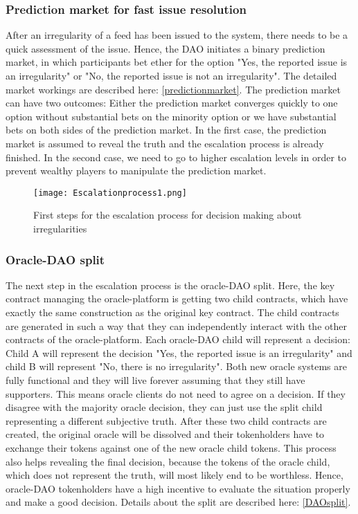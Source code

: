 \documentclass[a4paper]{article}
\begin{document}
\subsubsection{Prediction market for fast issue resolution}
After an irregularity of a feed has been issued to the system, there needs to be a quick assessment of the issue. Hence, the DAO initiates a binary prediction market, in which participants bet ether for the option "Yes, the reported issue is an irregularity" or "No, the reported issue is not an irregularity". The detailed market workings are described here: \ref{predictionmarket}. The prediction market can have two outcomes: Either the prediction market converges quickly to one option without substantial bets on the minority option or we have substantial bets on both sides of the prediction market.
In the first case, the prediction market is assumed to reveal the truth and the escalation process is already finished. In the second case, we need to go to higher escalation levels in order to prevent wealthy players to manipulate the prediction market.
\begin{figure}
\centering
\texttt{[image: Escalationprocess1.png]}
\caption{\label{fig:escalation1}First steps for the escalation process for decision making about irregularities}
\end{figure}
\subsubsection{Oracle-DAO split}
The next step in the escalation process is the oracle-DAO split. Here, the key contract managing the oracle-platform is getting two child contracts, which have exactly the same construction as the original key contract.
The child contracts are generated in such a way that they can independently interact with the other contracts of the oracle-platform.
Each oracle-DAO child will represent a decision: Child A will represent the decision "Yes, the reported issue is an irregularity" and child B will represent "No, there is no irregularity".
Both new oracle systems are fully functional and they will live forever assuming that they still have supporters. This means oracle clients do not need to agree on a decision. If they disagree with the majority oracle decision, they can just use the split child representing a different subjective truth.
After these two child contracts are created, the original oracle will be dissolved and their tokenholders have to exchange their tokens against one of the new oracle child tokens. 
This process also helps revealing the final decision, because the tokens of the oracle child, which does not represent the truth, will most likely end to be worthless. Hence, oracle-DAO tokenholders have a high incentive to evaluate the situation properly and make a good decision. Details about the split are described here: \ref{DAOsplit}.
\end{document}
